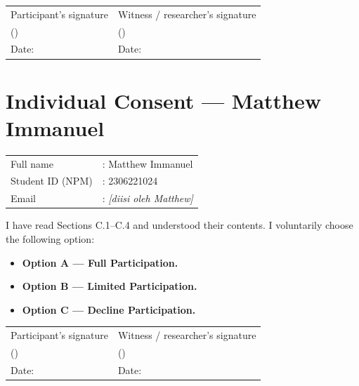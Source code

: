 \documentclass[11pt,a4paper,oneside]{report}
\begin{document}
\vfill

\noindent
\begin{tabular}{p{}p{}}
\centering Participant's signature & \centering Witness / researcher's signature \tabularnewline[2.5cm]
\centering (\hspace{4cm}) & \centering (\hspace{4cm}) \tabularnewline
\centering Date: \hspace{3cm} & \centering Date: \hspace{3cm} \tabularnewline
\end{tabular}

\newpage
\section*{Individual Consent --- Matthew Immanuel}

\noindent
\begin{tabular}{p{}p{}}
Full name        & : Matthew Immanuel \\
Student ID (NPM) & : 2306221024 \\
Email            & : \textit{[diisi oleh Matthew]} \\
\end{tabular}

\vspace{1.5em}

I have read Sections C.1--C.4 and understood their contents. I voluntarily choose the following option:

\vspace{0.5em}

\begin{itemize}[leftmargin=2em, label={$\square$}, itemsep=0.8em]
    \item \textbf{Option A --- Full Participation.}
    \item \textbf{Option B --- Limited Participation.}
    \item \textbf{Option C --- Decline Participation.}
\end{itemize}

\vfill

\noindent
\begin{tabular}{p{}p{}}
\centering Participant's signature & \centering Witness / researcher's signature \tabularnewline[2.5cm]
\centering (\hspace{4cm}) & \centering (\hspace{4cm}) \tabularnewline
\centering Date: \hspace{3cm} & \centering Date: \hspace{3cm} \tabularnewline
\end{tabular}
\end{document}
